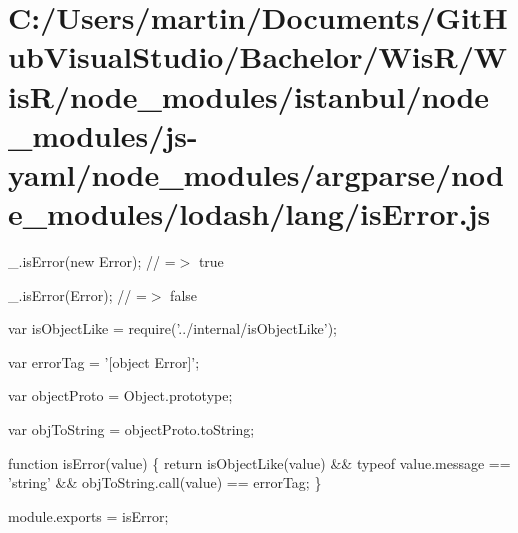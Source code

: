 \hypertarget{_c_1_2_users_2martin_2_documents_2_git_hub_visual_studio_2_bachelor_2_wis_r_2_wis_r_2node_moduleff515ee7e02bc3930d6e69b08dedfba1}{}\section{C\+:/\+Users/martin/\+Documents/\+Git\+Hub\+Visual\+Studio/\+Bachelor/\+Wis\+R/\+Wis\+R/node\+\_\+modules/istanbul/node\+\_\+modules/js-\/yaml/node\+\_\+modules/argparse/node\+\_\+modules/lodash/lang/is\+Error.\+js}
\+\_\+.\+is\+Error(new Error); // =$>$ true

\+\_\+.\+is\+Error(\+Error); // =$>$ false


\begin{DoxyCodeInclude}
var isObjectLike = require(\textcolor{stringliteral}{'../internal/isObjectLike'});

var errorTag = \textcolor{stringliteral}{'[object Error]'};

var objectProto = Object.prototype;

var objToString = objectProto.toString;

\textcolor{keyword}{function} isError(value) \{
  \textcolor{keywordflow}{return} isObjectLike(value) && typeof value.message == \textcolor{stringliteral}{'string'} && objToString.call(value) == errorTag;
\}

module.exports = isError;
\end{DoxyCodeInclude}
 